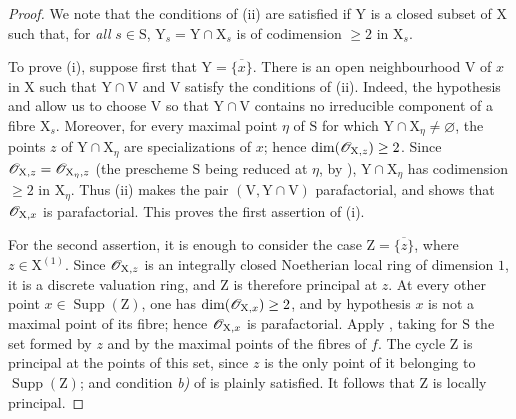 \begin{proof}
We note that the conditions of (ii) are satisfied if $\mathrm{Y}$ is a closed subset of $\mathrm{X}$ such that, for \emph{all} $s\in\mathrm{S}$, $\mathrm{Y}_s=\mathrm{Y}\cap\mathrm{X}_s$ is of codimension $\geq 2$ in $\mathrm{X}_s$.

To prove (i), suppose first that $\mathrm{Y}=\overline{\{x\}}$. There is an open neighbourhood $\mathrm{V}$ of $x$ in $\mathrm{X}$ such that $\mathrm{Y}\cap\mathrm{V}$ and $\mathrm{V}$ satisfy the conditions of (ii). Indeed, the hypothesis and  allow us to choose $\mathrm{V}$ so that $\mathrm{Y}\cap\mathrm{V}$ contains no irreducible component of a fibre $\mathrm{X}_s$. Moreover, for every maximal point $\eta$ of $\mathrm{S}$ for which $\mathrm{Y}\cap\mathrm{X}_\eta\neq\varnothing$, the points $z$ of $\mathrm{Y}\cap\mathrm{X}_\eta$ are specializations of $x$; hence $\dim(\mathscr{O}_{\mathrm{X},z})\geq2$. Since $\mathscr{O}_{\mathrm{X},z}=\mathscr{O}_{\mathrm{X}_\eta,z}$ (the prescheme $\mathrm{S}$ being reduced at $\eta$, by ), $\mathrm{Y}\cap\mathrm{X}_\eta$ has codimension $\geq2$ in $\mathrm{X}_\eta$. Thus (ii) makes the pair $(\mathrm{V},\mathrm{Y}\cap\mathrm{V})$ parafactorial, and  shows that $\mathscr{O}_{\mathrm{X},x}$ is parafactorial. This proves the first assertion of (i).

For the second assertion, it is enough to consider the case $\mathrm{Z}=\overline{\{z\}}$, where $z\in\mathrm{X}^{(1)}$. Since $\mathscr{O}_{\mathrm{X},z}$ is an integrally closed Noetherian local ring of dimension $1$, it is a discrete valuation ring, and $\mathrm{Z}$ is therefore principal at $z$. At every other point $x\in\operatorname{Supp}(\mathrm{Z})$, one has $\dim(\mathscr{O}_{\mathrm{X},x})\geq2$, and by hypothesis $x$ is not a maximal point of its fibre; hence $\mathscr{O}_{\mathrm{X},x}$ is parafactorial. Apply , taking for $\mathrm{S}$ the set formed by $z$ and by the maximal points of the fibres of $f$. The cycle $\mathrm{Z}$ is principal at the points of this set, since $z$ is the only point of it belonging to $\operatorname{Supp}(\mathrm{Z})$; and condition \emph{b)} of  is plainly satisfied. It follows that $\mathrm{Z}$ is locally principal.


\end{proof}
